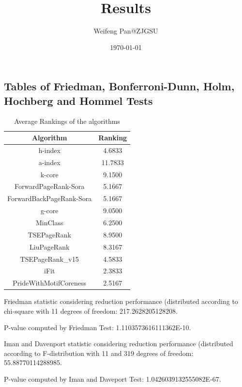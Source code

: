 \documentclass[a4paper,10pt]{article}
\title{Results}
\author{Weifeng Pan@ZJGSU}
\date{\today}
\begin{document}
\begin{landscape}
\oddsidemargin 0in \topmargin 0in\maketitle
\section{Tables of Friedman, Bonferroni-Dunn, Holm, Hochberg and Hommel Tests}
\begin{table}[!htp]
\centering
\caption{Average Rankings of the algorithms
}\begin{tabular}{c|c}
Algorithm&Ranking\\
\hline
h-index&4.6833\\
a-index&11.7833\\
k-core&9.1500\\
ForwardPageRank-Sora&5.1667\\
ForwardBackPageRank-Sora&5.1667\\
g-core&9.0500\\
MinClass&6.2500\\
TSEPageRank&8.9500\\
LiuPageRank&8.3167\\
TSEPageRank_v15&4.5833\\
iFit&2.3833\\
PrideWithMotifCoreness&2.5167\\
\end{tabular}
\end{table}


Friedman statistic considering reduction performance (distributed according to chi-square with 11 degrees of freedom: 217.2628205128208.


P-value computed by Friedman Test: 1.1103573616111362E-10.\newline

Iman and Davenport statistic considering reduction performance (distributed according to F-distribution with 11 and 319 degrees of freedom: 55.88770114288985.


P-value computed by Iman and Daveport Test: 1.0426039132555082E-67.\newline


\end{landscape}
\end{document}
